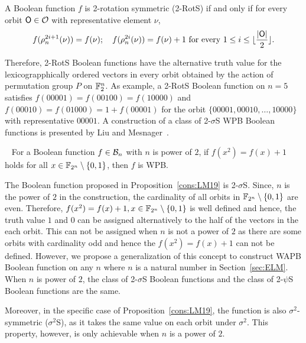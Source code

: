 \documentclass{llncs}
\begin{document}
\begin{definition}\label{def:2RSF}
A Boolean function $f$ is 2-rotation symmetric (2-RotS) if and only if 
for every orbit $\mathsf{O} \in \mathcal{O}$ with representative element $\nu$,
$$f(\rho_n^{2i+1}(\nu)) = f(\nu);~~~ f(\rho_n^{2i}(\nu)) = f(\nu)+1 \text{ for every } 1 \leq i \leq \lfloor\frac{|\mathsf{O}|}{2}\rfloor.$$ 
\end{definition}
Therefore, 2-RotS Boolean functions have the alternative truth value for the lexicograpphically ordered vectors in every orbit obtained by the action of permutation group $P$ on $\mathbb{F}_2^n$. 
As example, a 2-RotS Boolean function on $n = 5$ satisfies $f(00001) = f(00100) = f(10000)$ and $f(00010) = f(01000) = 1+f(00001)$ for the orbit $\{00001, 00010, \ldots, 10000\}$ with representative  $00001$.
\fi
A construction of a class of 2-$\sigma$S WPB Boolean functions is presented by Liu and Mesnager~\cite{DCC:LiuMes19}.
\begin{proposition}~\cite{DCC:LiuMes19}\label{cons:LM19} For a Boolean function $f \in \mathcal{B}_n$ with $n$ is power of $2$, if $f(x^2)=f(x)+1$ holds for all $x \in \mathbb{F}_{2^n} \setminus \{0,1\}$, then $f$ is WPB.  
\end{proposition}
The Boolean function proposed in Proposition~\ref{cons:LM19} is 2-$\sigma$S.
Since, $n$ is the power of $2$ in the construction, the cardinality of all orbits in $\mathbb{F}_{2^n} \setminus \{0,1\}$ are even. Therefore, $f(x^2)=f(x)+1, x \in \mathbb{F}_{2^n} \setminus \{0,1\}$ is well defined and hence, the truth value $1$ and $0$ can be assigned alternatively to the half of the vectors in the each orbit. This can not be assigned when $n$ is not a power of $2$ as there are some orbits with cardinality odd and hence the $f(x^2) = f(x)+1$ can not be defined. 
However, we propose a generalization of this concept to construct WAPB Boolean function on any $n$ where $n$ is a natural number in Section~\ref{sec:ELM}. 
When $n$ is power of $2$, the class of 2-$\sigma$S Boolean functions and the class of 2-$\psi$S Boolean functions are the same. 

Moreover, in the specific case of Proposition~\ref{cons:LM19}, the function is also $\sigma^2$-symmetric ($\sigma^2$S), as it takes the same value on each orbit under $\sigma^2$. This property, however, is only achievable when $n$ is a power of $2$.
\end{document}
